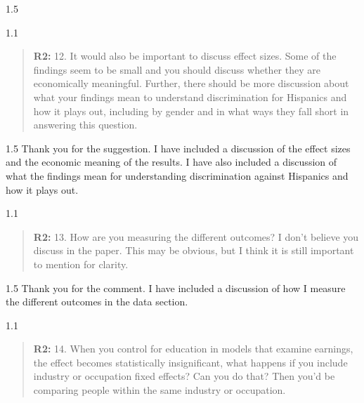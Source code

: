\documentclass[12pt,english]{article}
\newcommand{\rrquote}{1.1}
\newcommand{\rrxspc}{1.5}
\begin{document}
\begin{refsection}
\begin{spacing}{\rrxspc}
    \end{spacing}

    \begin{spacing}{\rrquote}
        \begin{quotation}
        \textbf{R2: } 12. It would also be important to discuss effect sizes. Some of the findings seem to be small and you should discuss whether they are economically meaningful. Further, there should be more discussion about what your findings mean to understand discrimination for Hispanics and how it plays out, including by gender and in what ways they fall short in answering this question.
              
        \end{quotation}
        \end{spacing}
        
        \begin{spacing}{\rrxspc}
            Thank you for the suggestion. I have included a discussion of the effect sizes and the economic meaning of the results. I have also included a discussion of what the findings mean for understanding discrimination against Hispanics and how it plays out.
    \end{spacing}

    \begin{spacing}{\rrquote}
        \begin{quotation}
        \textbf{R2: } 13. How are you measuring the different outcomes? I don’t believe you discuss in the paper. This may be obvious, but I think it is still important to mention for clarity.
              
        \end{quotation}
        \end{spacing}
    
        \begin{spacing}{\rrxspc}
            Thank you for the comment. I have included a discussion of how I measure the different outcomes in the data section.        
    \end{spacing}

    \begin{spacing}{\rrquote}
        \begin{quotation}
        \textbf{R2: } 14. When you control for education in models that examine earnings, the effect becomes statistically insignificant, what happens if you include industry or occupation fixed effects? Can you do that? Then you'd be comparing people within the same industry or occupation.
              

\end{quotation}
\end{spacing}
\end{refsection}
\end{document}
